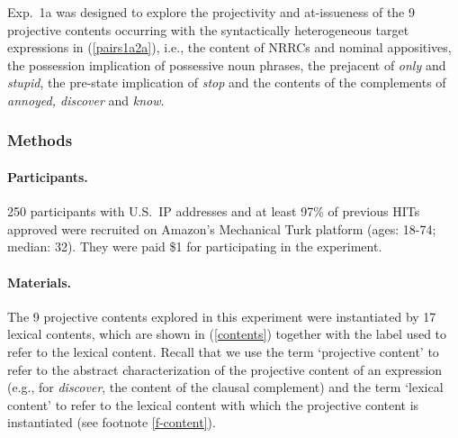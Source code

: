 \documentclass[11pt,fleqn]{article}
\newcommand{\6}{\mbox{$[\hspace*{-.6mm}[$}}
\newcommand{\9}{\mbox{$]\hspace*{-.6mm}]$}}
\begin{document}
Exp.~1a was designed to explore the projectivity and at-issueness of the 9 projective contents occurring with the syntactically heterogeneous target expressions in (\ref{pairs1a2a}), i.e., the content of NRRCs and nominal appositives, the possession implication of possessive noun phrases, the prejacent of {\em only} and {\em stupid}, the pre-state implication of {\em stop} and the contents of the complements of {\em annoyed, discover} and {\em know}.

\subsubsection{Methods}\label{s-methods-1a}

\paragraph{Participants.} 250 participants with U.S.\ IP addresses and at least 97\% of previous HITs approved were recruited on Amazon's Mechanical Turk platform (ages: 18-74; median: 32). They were paid \$1 for participating in the experiment. 

\paragraph{Materials.} The 9 projective contents explored in this experiment were instantiated by 17 lexical contents, which are shown in (\ref{contents}) together with the label used to refer to the lexical content. Recall that we use the term `projective content' to refer to the abstract characterization of the projective content of an expression (e.g., for {\em discover}, the content of the clausal complement) and the term `lexical content' to refer to the lexical content with which the projective content is instantiated (see footnote \ref{f-content}).
\end{document}
